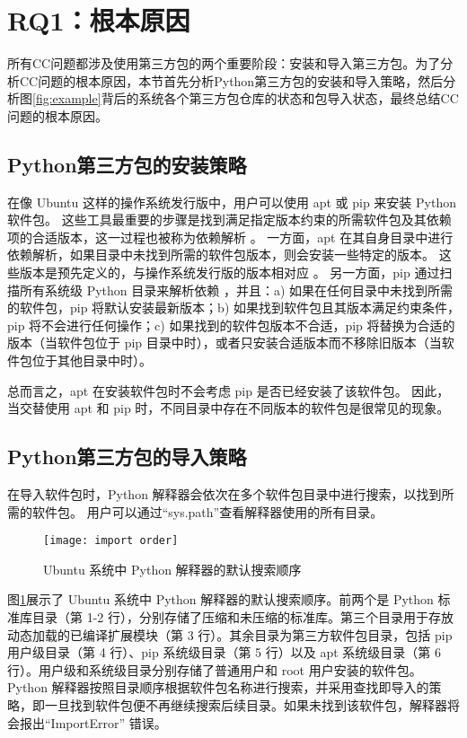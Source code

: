 \section{RQ1：根本原因}
所有CC问题都涉及使用第三方包的两个重要阶段：安装和导入第三方包。为了分析CC问题的根本原因，本节首先分析Python第三方包的安装和导入策略，然后分析图\ref{fig:example}背后的系统各个第三方包仓库的状态和包导入状态，最终总结CC问题的根本原因。

\subsection{Python第三方包的安装策略}
在像 Ubuntu 这样的操作系统发行版中，用户可以使用 apt 或 pip 来安装 Python 软件包。
这些工具最重要的步骤是找到满足指定版本约束的所需软件包及其依赖项的合适版本，这一过程也被称为依赖解析 。
一方面，apt 在其自身目录中进行依赖解析，如果目录中未找到所需的软件包版本，则会安装一些特定的版本。
这些版本是预先定义的，与操作系统发行版的版本相对应 。
另一方面，pip 通过扫描所有系统级 Python 目录来解析依赖 ，并且：a) 如果在任何目录中未找到所需的软件包，pip 将默认安装最新版本；b) 如果找到软件包且其版本满足约束条件，pip 将不会进行任何操作；c) 如果找到的软件包版本不合适，pip 将替换为合适的版本（当软件包位于 pip 目录中时），或者只安装合适版本而不移除旧版本（当软件包位于其他目录中时）。

总而言之，apt 在安装软件包时不会考虑 pip 是否已经安装了该软件包。
因此，当交替使用 apt 和 pip 时，不同目录中存在不同版本的软件包是很常见的现象。

\subsection{Python第三方包的导入策略}
在导入软件包时，Python 解释器会依次在多个软件包目录中进行搜索，以找到所需的软件包。
用户可以通过“sys.path”查看解释器使用的所有目录。
\begin{figure}[htbp] %
	\centering
	\texttt{[image: import order]}
	\caption{Ubuntu 系统中 Python 解释器的默认搜索顺序}
	\label{fig:order}
\end{figure}
图\ref{fig:order}展示了 Ubuntu 系统中 Python 解释器的默认搜索顺序。前两个是 Python 标准库目录（第 1-2 行），分别存储了压缩和未压缩的标准库。第三个目录用于存放动态加载的已编译扩展模块（第 3 行）。其余目录为第三方软件包目录，包括 pip 用户级目录（第 4 行）、pip 系统级目录（第 5 行）以及 apt 系统级目录（第 6 行）。用户级和系统级目录分别存储了普通用户和 root 用户安装的软件包。Python 解释器按照目录顺序根据软件包名称进行搜索，并采用查找即导入的策略，即一旦找到软件包便不再继续搜索后续目录。如果未找到该软件包，解释器将会报出“ImportError” 错误。

